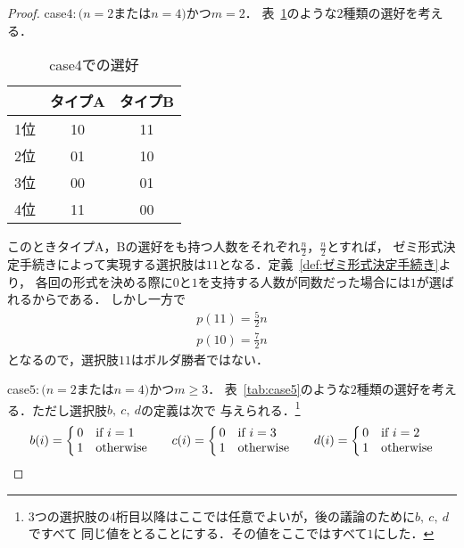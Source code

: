 \documentclass[dvipdfmx]{jsarticle}
\begin{document}
\begin{proof}
  \noindent{}case$4\colon$$(n = 2$または$n = 4)$かつ$m = 2$．
  表~\ref{tab:case4}のような$2$種類の選好を考える．
  \begin{table}[h]
    \caption{case4での選好}\label{tab:case4}
    \begin{center}
      \begin{tabular}{c|c|c}\hline
            & タイプA & タイプB \\ \hline
        1位 & 10 & 11  \\ 
        2位 & 01 & 10  \\ 
        3位 & 00 & 01  \\
        4位 & 11 & 00  \\ \hline
      \end{tabular}
    \end{center}
  \end{table}
  このときタイプA，Bの選好をも持つ人数をそれぞれ$\frac{n}{2}$，$\frac{n}{2}$とすれば，
  ゼミ形式決定手続きによって実現する選択肢は$11$となる．定義~\ref{def:ゼミ形式決定手続き}より，
  各回の形式を決める際に$0$と$1$を支持する人数が同数だった場合には$1$が選ばれるからである．
  しかし一方で
  \begin{gather*}
    p(11) = \frac{5}{2}n \\
    p(10) = \frac{7}{2}n
  \end{gather*}
  となるので，選択肢$11$はボルダ勝者ではない．

  \noindent{}case$5\colon$$(n = 2$または$n = 4)$かつ$m \geq 3$．
  表~\ref{tab:case5}のような$2$種類の選好を考える．ただし選択肢$b,\ c,\ d$の定義は次で
  与えられる．\<\footnote{$3$つの選択肢の$4$桁目以降はここでは任意でよいが，後の議論のために$b,\ c,\ d$ですべて
  同じ値をとることにする．その値をここではすべて$1$にした．}\
  \[
    b(i)
    = \left\{ \begin{array}{@{\,}rl@{}}
      0 & \mbox{if}\ i = 1 \\
      1 & \mbox{otherwise}
    \end{array} \right.
    \hspace{6mm}
    c(i)
    = \left\{ \begin{array}{@{\,}rl@{}}
      0 & \mbox{if}\ i = 3 \\
      1 & \mbox{otherwise}
    \end{array} \right.
    \hspace{6mm}
    d(i)
    = \left\{ \begin{array}{@{\,}rl@{}}
      0 & \mbox{if}\ i=2 \\
      1 & \mbox{otherwise}
    \end{array} \right.
  \]
  

\end{proof}
\end{document}
